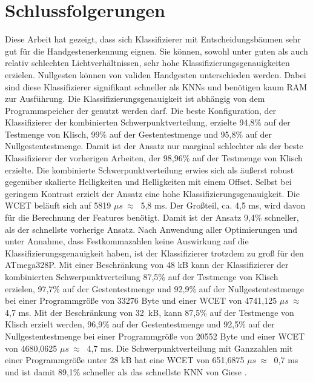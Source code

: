 \chapter{Schlussfolgerungen}
Diese Arbeit hat gezeigt, dass sich Klassifizierer mit Entscheidungsbäumen sehr gut für die Handgestenerkennung eignen. Sie können, sowohl unter guten als auch
relativ schlechten Lichtverhältnissen, sehr hohe Klassifizierungsgenauigkeiten erzielen. Nullgesten können von validen Handgesten unterschieden werden. Dabei sind diese Klassifizierer signifikant
schneller als KNNs und benötigen kaum RAM zur Ausführung. Die Klassifizierungsgenauigkeit ist abhängig von dem Programmspeicher der genutzt werden darf.
\newline
\newline
Die beste Konfiguration, der Klassifizierer der kombinierten Schwerpunktverteilung, erzielte 94,8\% auf der Testmenge von Klisch, 99\% auf der Gestentestmenge und 95,8\% auf der Nullgestentestmenge. Damit
ist der Ansatz nur marginal schlechter als der beste Klassifizierer der vorherigen Arbeiten, der 98,96\% auf der Testmenge von Klisch erzielte. Die kombinierte Schwerpunktverteilung erwies sich als
äußerst robust gegenüber skalierte Helligkeiten und Helligkeiten mit einem Offset. Selbst bei geringem Kontrast erzielt der Ansatz eine hohe Klassifizierungsgenauigkeit. Die WCET beläuft
sich auf 5819 $\mu s\ \approx\ $ 5,8 ms. Der Großteil, ca. 4,5 ms, wird davon für die Berechnung der Features benötigt. Damit ist der Ansatz 9,4\% schneller, als der schnellste vorherige Ansatz.
Nach Anwendung aller Optimierungen und unter Annahme, dass Festkommazahlen keine Auswirkung auf die Klassifizierungsgenauigkeit haben, ist der Klassifizierer trotzdem zu groß für den ATmega328P.
\newline
\newline
Mit einer Beschränkung von 48 kB kann der Klassifizierer der kombinierten Schwerpunktverteilung 87,5\% auf der Testmenge von Klisch erzielen, 97,7\% auf
der Gestentestmenge und 92,9\% auf der Nullgestentestmenge bei einer Programmgröße von 33276 Byte und einer WCET von 4741,125 $\mu s\ \approx\ $ 4,7 ms. Mit der Beschränkung von 32\ kB, kann 87,5\% auf der
Testmenge von Klisch erzielt werden, 96,9\% auf der Gestentestmenge und 92,5\% auf der Nullgestentestmenge bei einer Programmgröße von 20552 Byte und einer WCET von 4680,0625 $\mu s\ \approx\ $ 4,7 ms.
\newline
\newline
Die Schwerpunktverteilung mit Ganzzahlen mit einer Programmgröße unter 28 kB hat eine WCET von 651,6875 $\mu s\ \approx\ $ 0,7 ms und ist damit 89,1\% schneller als das schnellste KNN von Giese \cite{gieseThesis}.
